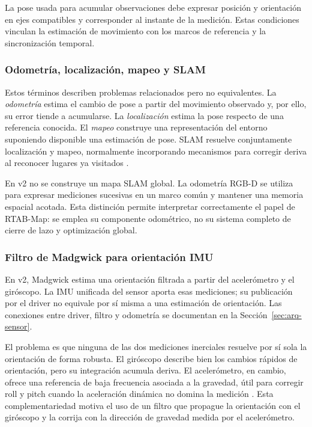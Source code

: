 La pose usada para acumular observaciones debe expresar posición y orientación en ejes
compatibles y corresponder al instante de la medición. Estas condiciones vinculan la estimación
de movimiento con los marcos de referencia y la sincronización temporal.

\subsubsection{Odometría, localización, mapeo y SLAM}

Estos términos describen problemas relacionados pero no equivalentes. La \emph{odometría}
estima el cambio de pose a partir del movimiento observado y, por ello, su error tiende a
acumularse. La \emph{localización} estima la pose respecto de una referencia conocida. El
\emph{mapeo} construye una representación del entorno suponiendo disponible una estimación de
pose. SLAM resuelve conjuntamente localización y mapeo, normalmente incorporando mecanismos para
corregir deriva al reconocer lugares ya visitados \cite{Thrun2005}.

En v2 no se construye un mapa SLAM global. La odometría RGB-D se utiliza para expresar mediciones
sucesivas en un marco común y mantener una memoria espacial acotada. Esta distinción permite
interpretar correctamente el papel de RTAB-Map: se emplea su componente odométrico, no su sistema
completo de cierre de lazo y optimización global.

\subsubsection{Filtro de Madgwick para orientación IMU}

En v2, Madgwick estima una orientación filtrada a partir del acelerómetro y el giróscopo.
La IMU unificada del sensor aporta esas mediciones; su publicación por el driver no equivale
por sí misma a una estimación de orientación. Las conexiones entre driver, filtro y odometría
se documentan en la Sección~\ref{sec:arq-sensor}.

El problema es que ninguna de las dos mediciones inerciales resuelve por sí sola la orientación
de forma robusta. El giróscopo describe bien los cambios rápidos de orientación, pero su
integración acumula deriva. El acelerómetro, en cambio, ofrece una referencia de baja
frecuencia asociada a la gravedad, útil para corregir roll y pitch cuando la aceleración
dinámica no domina la medición \cite{Woodman2007}. Esta complementariedad motiva el uso de
un filtro que propague la orientación con el giróscopo y la corrija con la dirección de
gravedad medida por el acelerómetro.

